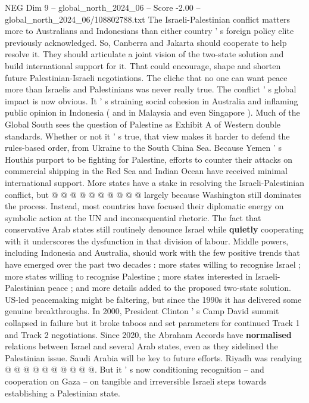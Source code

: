 \begin{textsample}{NEG Dim 9 – global\_north\_2024\_06 – Score -2.00 – global\_north\_2024\_06/108802788.txt}  \label{ex:f9_neg_172}
The Israeli-Palestinian conflict matters more to Australians and Indonesians than either country ' s foreign policy elite previously acknowledged.
So, Canberra and Jakarta should cooperate to help resolve it.
They should articulate a joint vision of the two-state solution and build international support for it.
That could encourage, shape and shorten future Palestinian-Israeli negotiations.
The cliche that no one can want peace more than Israelis and Palestinians was never really true.
The conflict ' s global impact is now obvious.
It ' s straining social cohesion in Australia and inflaming public opinion in Indonesia ( and in Malaysia and even Singapore ).
Much of the Global South sees the question of Palestine as Exhibit A of Western double standards.
Whether or not it ' s true, that view makes it harder to defend the rules-based order, from Ukraine to the South China Sea.
Because Yemen ' s Houthis purport to be fighting for Palestine, efforts to counter their attacks on commercial shipping in the Red Sea and Indian Ocean have received minimal international support.
More states have a stake in resolving the Israeli-Palestinian conflict, but @ @ @ @ @ @ @ @ @ @ largely because Washington still dominates the process.
Instead, most countries have focused their diplomatic energy on symbolic action at the UN and inconsequential rhetoric.
The fact that conservative Arab states still routinely denounce Israel while \textbf{quietly} cooperating with it underscores the dysfunction in that division of labour.
Middle powers, including Indonesia and Australia, should work with the few positive trends that have emerged over the past two decades : more states willing to recognise Israel ; more states willing to recognise Palestine ; more states interested in Israeli-Palestinian peace ; and more details added to the proposed two-state solution.
US-led peacemaking might be faltering, but since the 1990s it has delivered some genuine breakthroughs.
In 2000, President Clinton ' s Camp David summit collapsed in failure but it broke taboos and set parameters for continued Track 1 and Track 2 negotiations.
Since 2020, the Abraham Accords have \textbf{normalised} relations between Israel and several Arab states, even as they sidelined the Palestinian issue.
Saudi Arabia will be key to future efforts.
Riyadh was readying @ @ @ @ @ @ @ @ @ @.
But it ' s now conditioning recognition -- and cooperation on Gaza -- on tangible and irreversible Israeli steps towards establishing a Palestinian state.

\end{textsample}
